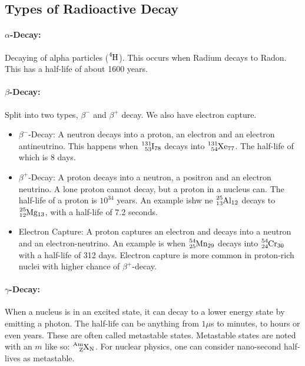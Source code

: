 \subsection{Types of Radioactive Decay}
\paragraph{$α$-Decay:}
Decaying of alpha particles ($\ce{_{}^{4}\text{H}_{}}$). This occurs when Radium decays to Radon. This has a half-life of about 1600 years.

\paragraph{$β$-Decay:} 
Split into two types, $β^-$ and $β^+$ decay. We also have electron capture.
\begin{itemize}
    \item $β^-$-Decay: A neutron decays into a proton, an electron and an electron antineutrino. This happens when $\ce{_{53}^{131}\text{I}_{78}}$ decays into $\ce{_{54}^{131}\text{Xe}_{77}}$. The half-life of which is 8 days.
    \item $β^+$-Decay: A proton decays into a neutron, a positron and an electron neutrino. A lone proton cannot decay, but a proton in a nucleus can. The half-life of a proton is $10^{34}$ years. An example ishw ne $\ce{_{13}^{25}\text{Al}_{12}}$ decays to $\ce{_{12}^{25}\text{Mg}_{13}}$, with a half-life of 7.2 seconds. 
    \item Electron Capture: A proton captures an electron and decays into a neutron and an electron-neutrino. An example is when $\ce{_{25}^{54}\text{Mn}_{29}}$ decays into $\ce{_{24}^{54}\text{Cr}_{30}}$ with a half-life of 312 days. Electron capture is more common in proton-rich nuclei with higher chance of $β^{+}$-decay. 
\end{itemize}

\paragraph{$γ$-Decay:}
When a nucleus is in an excited state, it can decay to a lower energy state by emitting a photon. The half-life can be anything from $1μ$s to minutes, to hours or even years. These are often called metastable states. Metastable states are noted with an $m$ like so: $\ce{_{Z}^{Am}\text{X}_{N}}$. For nuclear physics, one can consider nano-second half-lives as metastable. 



